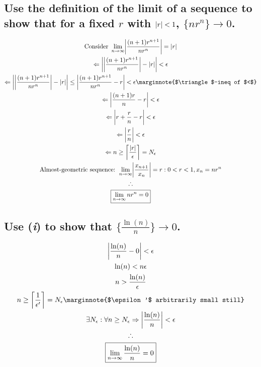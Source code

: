 \documentclass[letterpaper]{article}
\DeclarePairedDelimiter{\ceil}{\lceil}{\rceil}
\DeclarePairedDelimiter\abs{\lvert}{\rvert}
\begin{document}
\section{}
\subsection{Use the definition of the limit of a sequence to show that for a fixed $r$ with $\abs{r}<1$, $\{nr^n\}\rightarrow0$.}
\begin{gather*}
\text{Consider }\lim_{n\rightarrow\infty}\abs[\bigg]{\frac{(n+1)r^{n+1}}{nr^n}}=\abs{r} \\
\Leftarrow \abs[\bigg]{\abs[\bigg]{\frac{(n+1)r^{n+1}}{nr^n}}-\abs{r}}<\epsilon \\
\Leftarrow \abs[\bigg]{\abs[\bigg]{\frac{(n+1)r^{n+1}}{nr^n}}-\abs{r}}\leq\abs[\bigg]{\frac{(n+1)r^{n+1}}{nr^n}-r}<\epsilon \marginnote{$\triangle$-ineq of $<$} \\
\Leftarrow \abs[\bigg]{\frac{(n+1)r}{n}-r}<\epsilon \\
\Leftarrow \abs[\bigg]{r+\frac{r}{n}-r}<\epsilon \\
\Leftarrow \abs[\bigg]{\frac{r}{n}}<\epsilon \\
\Leftarrow n\geq\ceil[\bigg]{\frac{\abs{r}}{\epsilon}}=N_\epsilon \\
\text{Almost-geometric sequence: } \lim_{n\rightarrow\infty}\abs[\bigg]{\frac{x_{n+1}}{x_n}}=r:0<r<1,x_n=nr^n \\
\therefore \\
\boxed{\lim_{n\rightarrow\infty}nr^n=0}
\end{gather*}
\subsection{Use (\textit{i}) to show that $\{\frac{\ln(n)}{n}\}\rightarrow0$.}
\begin{gather*}
\abs[\bigg]{\frac{\ln(n)}{n}-0}<\epsilon \\
\ln(n)<n\epsilon \\
n>\frac{\ln(n)}{\epsilon} \\
n\geq\ceil[\bigg]{\frac{1}{\epsilon'}}=N_\epsilon \marginnote{$\epsilon'$ arbitrarily small still} \\
\exists N_\epsilon:\forall n\geq N_\epsilon\Rightarrow\abs[\bigg]{\frac{\ln(n)}{n}}<\epsilon \\
\therefore \\
\boxed{\lim_{n\rightarrow\infty}\frac{\ln(n)}{n}=0}
\end{gather*}
\end{document}
